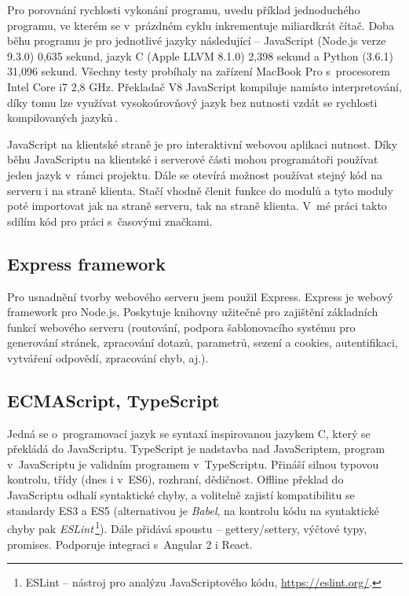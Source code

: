 Pro porovnání rychlosti vykonání programu, uvedu příklad jednoduchého programu, ve kterém se v~prázdném cyklu inkrementuje miliardkrát čítač. Doba běhu programu je pro jednotlivé jazyky následující -- JavaScript (Node.js verze 9.3.0) 0,635 sekund, jazyk C (Apple LLVM 8.1.0) 2,398 sekund a Python (3.6.1) 31,096 sekund. Všechny testy probíhaly na zařízení MacBook Pro s~procesorem Intel Core i7 2,8 GHz. Překladač V8 JavaScript kompiluje namísto interpretování, díky tomu lze využívat vysokoúrovňový jazyk bez nutnosti vzdát se rychlosti kompilovaných jazyků\,\cite{MasteringNodejs}.

JavaScript na klientské straně je pro interaktivní webovou aplikaci nutnost. Díky běhu JavaScriptu na klientské i serverové části mohou programátoři používat jeden jazyk v~rámci projektu. Dále se otevírá možnost používat stejný kód na serveru i na straně klienta. Stačí vhodně členit funkce do modulů a tyto moduly poté importovat jak na straně serveru, tak na straně klienta. V~mé práci takto sdílím kód pro práci s~časovými značkami.

\subsection{Express framework}
Pro usnadnění tvorby webového serveru jsem použil Express. Express je webový framework pro Node.js. Poskytuje knihovny užitečné pro zajištění základních funkcí webového serveru (routování, podpora šablonovacího systému pro generování stránek, zpracování dotazů, parametrů, sezení a cookies, autentifikaci, vytváření odpovědí, zpracování chyb, aj.).

\subsection{ECMAScript, TypeScript}
Jedná se o~programovací jazyk se syntaxí inspirovanou jazykem C, který se překládá do JavaScriptu. TypeScript je nadstavba nad JavaScriptem, program v~JavaScriptu je validním programem v~TypeScriptu. Přináší silnou typovou kontrolu, třídy (dnes i v~ES6), rozhraní, dědičnost. Offline překlad do JavaScriptu odhalí syntaktické chyby, a volitelně zajistí kompatibilitu se standardy ES3 a ES5 (alternativou je \textit{Babel}, na kontrolu kódu na syntaktické chyby pak \textit{ESLint}\,\footnote{ESLint -- nástroj pro analýzu JavaScriptového kódu, \url{https://eslint.org/}.}). Dále přidává spoustu  -- gettery/settery, výčtové typy, promises. Podporuje integraci s~Angular 2 i React.

